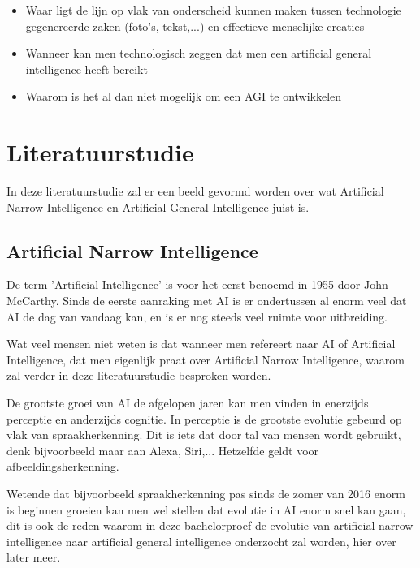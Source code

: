 \begin{itemize}
    \item Waar ligt de lijn op vlak van onderscheid kunnen maken tussen technologie gegenereerde zaken (foto's, tekst,...) en effectieve menselijke creaties
    \item Wanneer kan men technologisch zeggen dat men een artificial general intelligence heeft bereikt
    \item Waarom is het al dan niet mogelijk om een AGI te ontwikkelen
\end{itemize}


\section{Literatuurstudie}
\label{sec:state-of-the-art}

In deze literatuurstudie zal er een beeld gevormd worden over wat Artificial Narrow Intelligence en Artificial General Intelligence juist is.

\subsection{Artificial Narrow Intelligence}

De term 'Artificial Intelligence' is voor het eerst benoemd in 1955 door John McCarthy. Sinds de eerste aanraking met AI is er ondertussen al enorm veel dat AI de dag van vandaag kan, en is er nog steeds veel ruimte voor uitbreiding.

Wat veel mensen niet weten is dat wanneer men refereert naar AI of Artificial Intelligence, dat men eigenlijk praat over Artificial Narrow Intelligence, waarom zal verder in deze literatuurstudie besproken worden. 

De grootste groei van AI de afgelopen jaren kan men vinden in enerzijds perceptie en anderzijds cognitie. In perceptie is de grootste evolutie gebeurd op vlak van spraakherkenning. Dit is iets dat door tal van mensen wordt gebruikt, denk bijvoorbeeld maar aan Alexa, Siri,... Hetzelfde geldt voor afbeeldingsherkenning.

Wetende dat bijvoorbeeld spraakherkenning pas sinds de zomer van 2016 enorm is beginnen groeien kan men wel stellen dat evolutie in AI enorm snel kan gaan, dit is ook de reden waarom in deze bachelorproef de evolutie van artificial narrow intelligence naar artificial general intelligence onderzocht zal worden, hier over later meer. \autocite{brynjolfsson2017artificial}

